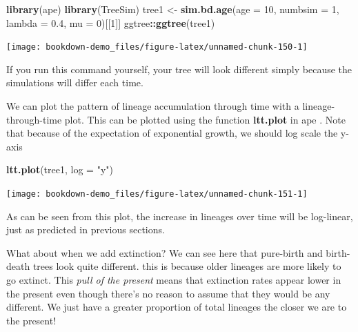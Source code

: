 \documentclass[
]{book}
\newenvironment{Shaded}{\begin{snugshade}}{\end{snugshade}}
\newcommand{\DataTypeTok}[1]{\textcolor[rgb]{0.13,0.29,0.53}{#1}}
\newcommand{\DecValTok}[1]{\textcolor[rgb]{0.00,0.00,0.81}{#1}}
\newcommand{\FloatTok}[1]{\textcolor[rgb]{0.00,0.00,0.81}{#1}}
\newcommand{\KeywordTok}[1]{\textcolor[rgb]{0.13,0.29,0.53}{\textbf{#1}}}
\newcommand{\NormalTok}[1]{#1}
\newcommand{\OperatorTok}[1]{\textcolor[rgb]{0.81,0.36,0.00}{\textbf{#1}}}
\newcommand{\StringTok}[1]{\textcolor[rgb]{0.31,0.60,0.02}{#1}}
\begin{document}
\begin{Shaded}
\begin{Highlighting}[]
\KeywordTok{library}\NormalTok{(ape)}
\KeywordTok{library}\NormalTok{(TreeSim)}
\NormalTok{tree1 \textless{}{-}}\StringTok{ }\KeywordTok{sim.bd.age}\NormalTok{(}\DataTypeTok{age =} \DecValTok{10}\NormalTok{, }\DataTypeTok{numbsim =} \DecValTok{1}\NormalTok{, }\DataTypeTok{lambda =} \FloatTok{0.4}\NormalTok{, }\DataTypeTok{mu =} \DecValTok{0}\NormalTok{)[[}\DecValTok{1}\NormalTok{]]}
\NormalTok{ggtree}\OperatorTok{::}\KeywordTok{ggtree}\NormalTok{(tree1)}
\end{Highlighting}
\end{Shaded}

\begin{center}\texttt{[image: bookdown-demo\_files/figure-latex/unnamed-chunk-150-1]} \end{center}

If you run this command yourself, your tree will look different simply because the simulations will differ each time.

We can plot the pattern of lineage accumulation through time with a lineage-through-time plot. This can be plotted using the function \textbf{ltt.plot} in ape \citep{ape}. Note that because of the expectation of exponential growth, we should log scale the y-axis

\begin{Shaded}
\begin{Highlighting}[]
\KeywordTok{ltt.plot}\NormalTok{(tree1, }\DataTypeTok{log =} \StringTok{"y"}\NormalTok{)}
\end{Highlighting}
\end{Shaded}

\begin{center}\texttt{[image: bookdown-demo\_files/figure-latex/unnamed-chunk-151-1]} \end{center}

As can be seen from this plot, the increase in lineages over time will be log-linear, just as predicted in previous sections.

What about when we add extinction? We can see here that pure-birth and birth-death trees look quite different. this is because older lineages are more likely to go extinct. This \emph{pull of the present} means that extinction rates appear lower in the present even though there's no reason to assume that they would be any different. We just have a greater proportion of total lineages the closer we are to the present!
\end{document}
